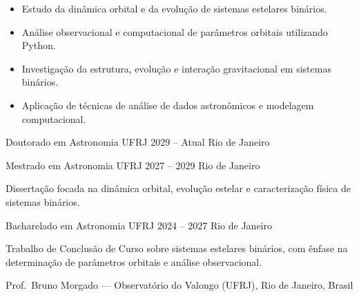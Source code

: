 \documentclass[10pt,a4paper,withhyper]{altacv}
\begin{document}



\makecvheader



\begin{itemize}
\item Estudo da dinâmica orbital e da evolução de sistemas estelares binários.
\item Análise observacional e computacional de parâmetros orbitais utilizando Python.
\end{itemize}

\divider


\begin{itemize}
\item Investigação da estrutura, evolução e interação gravitacional em sistemas binários.
\item Aplicação de técnicas de análise de dados astronômicos e modelagem computacional.
\end{itemize}



\medskip


\divider
{}
\divider
{}
\divider
{}


\cvevent
{Doutorado em Astronomia}
{UFRJ}
{2029 -- Atual}
{Rio de Janeiro}

\divider

\cvevent
{Mestrado em Astronomia}
{UFRJ}
{2027 -- 2029}
{Rio de Janeiro}

Dissertação focada na dinâmica orbital, evolução estelar e caracterização física de sistemas binários.

\divider

\cvevent
{Bacharelado em Astronomia}
{UFRJ}
{2024 -- 2027}
{Rio de Janeiro}

Trabalho de Conclusão de Curso sobre sistemas estelares binários, com ênfase na determinação de parâmetros orbitais e análise observacional.


Prof.\ Bruno Morgado — Observatório do Valongo (UFRJ), Rio de Janeiro, Brasil
\end{document}
